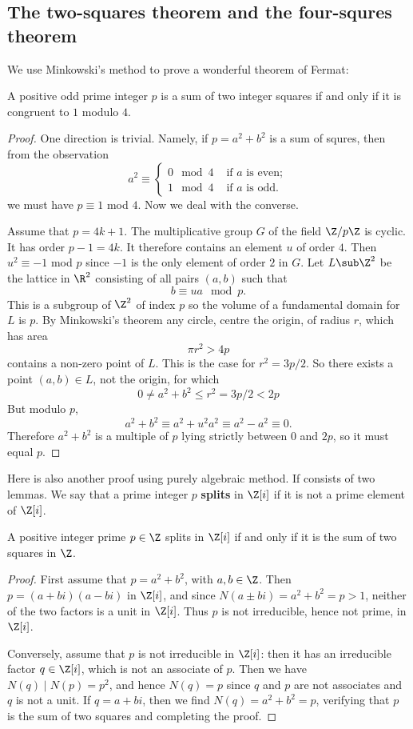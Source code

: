 \subsection{The two-squares theorem and the four-squres theorem}
We use Minkowski's method to prove a wonderful theorem of Fermat:
\begin{theorem}
A positive odd prime integer $p$ is a sum of two integer squares if and only if it is congruent to $1$ modulo $4$. 
\end{theorem}
\begin{proof}
One direction is trivial. Namely, if $p=a^2+b^2$ is a sum of squres, then from the observation
\[a^2\equiv\begin{cases}
0\mod 4&\text{ if $a$ is even};\\
1\mod 4&\text{ if $a$ is odd}.
\end{cases}\]
we must have $p\equiv1$ mod $4$. Now we deal with the converse.\par
Assume that $p=4k+1$. The multiplicative group $G$ of the field $\Z/p\Z$ is cyclic. It has order $p-1=4k$. It therefore contains an element $u$ of order $4$. Then $u^2\equiv-1$ mod $p$ since $-1$ is the only element of order $2$ in $G$. Let $L\sub\Z^2$ be the lattice in $\R^2$ consisting of all pairs $(a,b)$ such that
\[b\equiv ua\mod p.\]
This is a subgroup of $\Z^2$ of index $p$ so the volume of a fundamental domain for $L$ is $p$. By Minkowski's theorem any circle, centre the origin, of radius $r$, which has area
\[\pi r^2>4p\]
contains a non-zero point of $L$. This is the case for $r^2=3p/2$. So there exists a point $(a,b)\in L$, not the origin, for which
\[0\neq a^2+b^2\leq r^2=3p/2<2p\]
But modulo $p$,
\[a^2+b^2\equiv a^2+u^2a^2\equiv a^2-a^2\equiv0.\]
Therefore $a^2+b^2$ is a multiple of $p$ lying strictly between $0$ and $2p$, so it must equal $p$.
\end{proof}
Here is also another proof using purely algebraic method. If consists of two lemmas. We say that a prime integer $p$ \textbf{splits} in $\Z[i]$ if it is not a prime element of $\Z[i]$.
\begin{lemma}
A positive integer prime $p\in\Z$ splits in $\Z[i]$ if and only if it is the sum of two squares in $\Z$.
\end{lemma}
\begin{proof}
First assume that $p=a^2+b^2$, with $a,b\in\Z$. Then $p=(a+bi)(a-bi)$ in $\Z[i]$, and since $N(a\pm bi)=a^2+b^2=p>1$, neither of the two factors is a unit in $\Z[i]$. Thus $p$ is not irreducible, hence not prime, in $\Z[i]$.\par
Conversely, assume that $p$ is not irreducible in $\Z[i]$: then it has an irreducible factor $q\in\Z[i]$, which is not an associate of $p$. Then we have $N(q)\mid N(p)=p^2$, and hence $N(q)=p$ since $q$ and $p$ are not associates and $q$ is not a unit. If $q=a+bi$, then we find $N(q)=a^2+b^2=p$, verifying that $p$ is the sum of two squares and completing the proof.
\end{proof}
